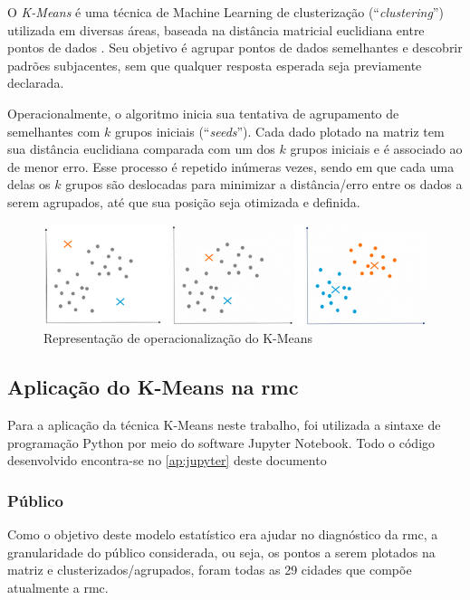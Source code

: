 	O \textit{K-Means} é uma técnica de Machine Learning de clusterização (``\textit{clustering}'') utilizada em diversas áreas, baseada na distância matricial euclidiana entre pontos de dados \cite{hartigan1979a}. Seu objetivo é agrupar pontos de dados semelhantes e descobrir padrões subjacentes, sem que qualquer resposta esperada seja previamente declarada.
	
	Operacionalmente, o algoritmo inicia sua tentativa de agrupamento de semelhantes com $k$ grupos iniciais (``\textit{seeds}''). Cada dado plotado na matriz tem sua distância euclidiana comparada com um dos $k$ grupos iniciais e é associado ao de menor erro. Esse processo é repetido inúmeras vezes, sendo em que cada uma delas os $k$ grupos são deslocadas para minimizar a distância/erro entre os dados a serem agrupados, até que sua posição seja otimizada e definida. 

	\begin{figure}
		\centering
		\caption{Representação de operacionalização do K-Means}
		\label{fig:kmeans}
		\includegraphics[width=1\linewidth]{img/machine_A}
	\end{figure}

	\subsection{Aplicação do K-Means na \gls{rmc}}
	
	Para a aplicação da técnica K-Means neste trabalho, foi utilizada a sintaxe de programação Python por meio do software Jupyter Notebook. Todo o código desenvolvido encontra-se no \autoref{ap:jupyter} deste documento
	
	\subsubsection{Público}
	
	Como o objetivo deste modelo estatístico era ajudar no diagnóstico da \glsdesc{rmc}, a granularidade do público considerada, ou seja, os pontos a serem plotados na matriz e clusterizados/agrupados, foram todas as 29 cidades que compõe atualmente a \gls{rmc}.
	
